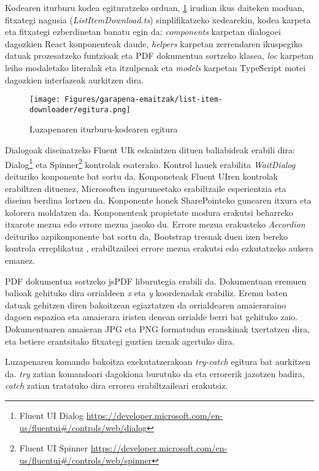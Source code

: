Kodearen iturburu kodea egituratzeko orduan, \ref{egitura} irudian ikus daiteken moduan, fitxategi nagusia (\textit{ListItemDownload.ts}) sinplifikatzeko xedearekin, kodea karpeta eta fitxategi ezberdinetan banatu egin da:
\textit{components} karpetan dialogoei dagozkien React konponenteak daude, \textit{helpers} karpetan zerrendaren ikuspegiko datuak prozesatzeko funtzioak eta PDF dokumentua sortzeko klasea, \textit{loc} karpetan leiho modaletako literalak eta itzulpenak eta \textit{models} karpetan TypeScript motei dagozkien interfazeak aurkitzen dira. 

\begin{figure}[H]
\centering
\texttt{[image: Figures/garapena-emaitzak/list-item-downloader/egitura.png]}
\caption{Luzapenaren iturburu-kodearen egitura}
\label{egitura}
\end{figure}

Dialogoak diseinatzeko Fluent UIk eskaintzen dituen baliabideak erabili dira: Dialog\footnote{Fluent UI Dialog \url{https://developer.microsoft.com/en-us/fluentui#/controls/web/dialog}} eta Spinner\footnote{Fluent UI Spinner \url{https://developer.microsoft.com/en-us/fluentui#/controls/web/spinner}} kontrolak esaterako. Kontrol hauek erabilita \textit{WaitDialog} deituriko konponente bat sortu da. Konponeteak Fluent UIren kontrolak erabiltzen dituenez, Microsoften inguruneetako erabiltzaile esperientzia eta diseinu berdina lortzen da. Konponente honek SharePointeko gunearen itxura eta kolorera moldatzen da. Konponenteak propietate modura erakutsi beharreko itxarote mezua edo errore mezua jasoko du. Errore mezua erakusteko \textit{Accordion} deituriko azpikonponente bat sortu da, Bootstrap tresnak duen izen bereko kontrola erreplikatuz \cite{bootstrap-accordion}, erabiltzaileei errore mezua erakutsi edo ezkutatzeko aukera emanez.

PDF dokumentua sortzeko jsPDF liburutegia erabili da. Dokumentuan eremuen balioak gehituko dira orrialdeen \textit{x} eta \textit{y} koordenadak erabiliz. Eremu baten datuak gehitzen diren bakoitzean egiaztatzen da orrialdearen amaieraraino dagoen espazioa eta amaierara iristen denean orrialde berri bat gehituko zaio. Dokumentuaren amaieran JPG eta PNG formatudun eranskinak txertatzen dira, eta betiere erantsitako fitxategi guztien izenak agertuko dira.

Luzapenaren komando bakoitza exekutatzerakoan \textit{try-catch} egitura bat aurkitzen da. \textit{try} zatian komandoari dagokiona burutuko da eta errorerik jazotzen badira, \textit{catch} zatian tratatuko dira errorea erabiltzaileari erakutsiz.

